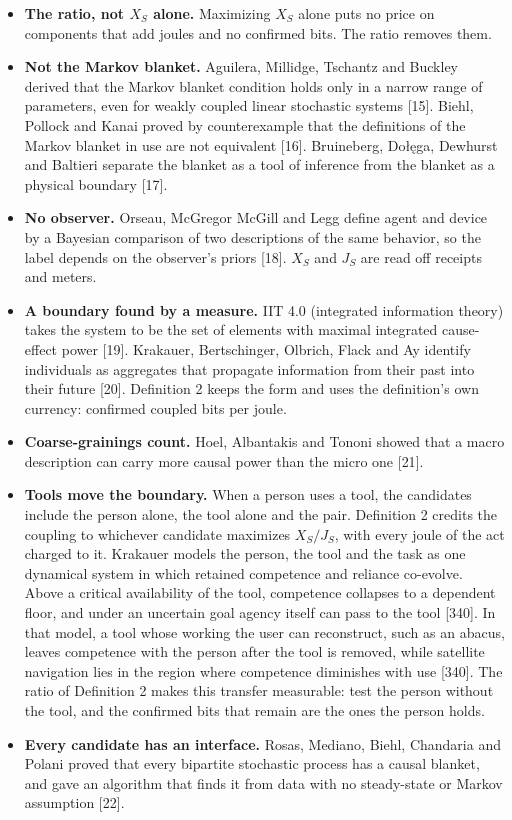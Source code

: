 \documentclass[
  10pt,
]{article}
\providecommand{\tightlist}{%
  \setlength{\itemsep}{0pt}\setlength{\parskip}{0pt}}
\begin{document}
\begin{itemize}
\tightlist
\item
  \textbf{The ratio, not \(X_S\) alone.} Maximizing \(X_S\) alone puts
  no price on components that add joules and no confirmed bits. The
  ratio removes them.
\item
  \textbf{Not the Markov blanket.} Aguilera, Millidge, Tschantz and
  Buckley derived that the Markov blanket condition holds only in a
  narrow range of parameters, even for weakly coupled linear stochastic
  systems {[}15{]}. Biehl, Pollock and Kanai proved by counterexample
  that the definitions of the Markov blanket in use are not equivalent
  {[}16{]}. Bruineberg, Dołęga, Dewhurst and Baltieri separate the
  blanket as a tool of inference from the blanket as a physical boundary
  {[}17{]}.
\item
  \textbf{No observer.} Orseau, McGregor McGill and Legg define agent
  and device by a Bayesian comparison of two descriptions of the same
  behavior, so the label depends on the observer's priors {[}18{]}.
  \(X_S\) and \(J_S\) are read off receipts and meters.
\item
  \textbf{A boundary found by a measure.} IIT 4.0 (integrated
  information theory) takes the system to be the set of elements with
  maximal integrated cause-effect power {[}19{]}. Krakauer,
  Bertschinger, Olbrich, Flack and Ay identify individuals as aggregates
  that propagate information from their past into their future {[}20{]}.
  Definition 2 keeps the form and uses the definition's own currency:
  confirmed coupled bits per joule.
\item
  \textbf{Coarse-grainings count.} Hoel, Albantakis and Tononi showed
  that a macro description can carry more causal power than the micro
  one {[}21{]}.
\item
  \textbf{Tools move the boundary.} When a person uses a tool, the
  candidates include the person alone, the tool alone and the pair.
  Definition 2 credits the coupling to whichever candidate maximizes
  \(X_S/J_S\), with every joule of the act charged to it. Krakauer
  models the person, the tool and the task as one dynamical system in
  which retained competence and reliance co-evolve. Above a critical
  availability of the tool, competence collapses to a dependent floor,
  and under an uncertain goal agency itself can pass to the tool
  {[}340{]}. In that model, a tool whose working the user can
  reconstruct, such as an abacus, leaves competence with the person
  after the tool is removed, while satellite navigation lies in the
  region where competence diminishes with use {[}340{]}. The ratio of
  Definition 2 makes this transfer measurable: test the person without
  the tool, and the confirmed bits that remain are the ones the person
  holds.
\item
  \textbf{Every candidate has an interface.} Rosas, Mediano, Biehl,
  Chandaria and Polani proved that every bipartite stochastic process
  has a causal blanket, and gave an algorithm that finds it from data
  with no steady-state or Markov assumption {[}22{]}.
\end{itemize}
\end{document}
